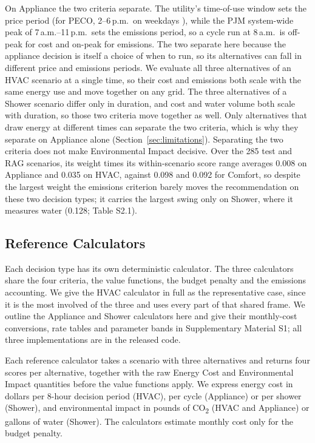 \documentclass[final,3p,times]{elsarticle}
\begin{document}
On Appliance the two criteria separate. The utility's time-of-use window sets the price period (for PECO, 2--6\,p.m.\ on weekdays \cite{peco2021}), while the PJM system-wide peak of 7\,a.m.--11\,p.m.\ sets the emissions period, so a cycle run at 8\,a.m.\ is off-peak for cost and on-peak for emissions. The two separate here because the appliance decision is itself a choice of when to run, so its alternatives can fall in different price and emissions periods. We evaluate all three alternatives of an HVAC scenario at a single time, so their cost and emissions both scale with the same energy use and move together on any grid. The three alternatives of a Shower scenario differ only in duration, and cost and water volume both scale with duration, so those two criteria move together as well. Only alternatives that draw energy at different times can separate the two criteria, which is why they separate on Appliance alone (Section~\ref{sec:limitations}). Separating the two criteria does not make Environmental Impact decisive. Over the 285 test and RAG scenarios, its weight times its within-scenario score range averages 0.008 on Appliance and 0.035 on HVAC, against 0.098 and 0.092 for Comfort, so despite the largest weight the emissions criterion barely moves the recommendation on these two decision types; it carries the largest swing only on Shower, where it measures water (0.128; Table S2.1).

\FloatBarrier
\subsection{Reference Calculators}
\label{sec:gt-calculators}

Each decision type has its own deterministic calculator. The three calculators share the four criteria, the value functions, the budget penalty and the emissions accounting. We give the HVAC calculator in full as the representative case, since it is the most involved of the three and uses every part of that shared frame. We outline the Appliance and Shower calculators here and give their monthly-cost conversions, rate tables and parameter bands in Supplementary Material S1; all three implementations are in the released code.

Each reference calculator takes a scenario with three alternatives and returns four scores per alternative, together with the raw Energy Cost and Environmental Impact quantities before the value functions apply. We express energy cost in dollars per 8-hour decision period (HVAC), per cycle (Appliance) or per shower (Shower), and environmental impact in pounds of CO\textsubscript{2} (HVAC and Appliance) or gallons of water (Shower). The calculators estimate monthly cost only for the budget penalty.
\end{document}
